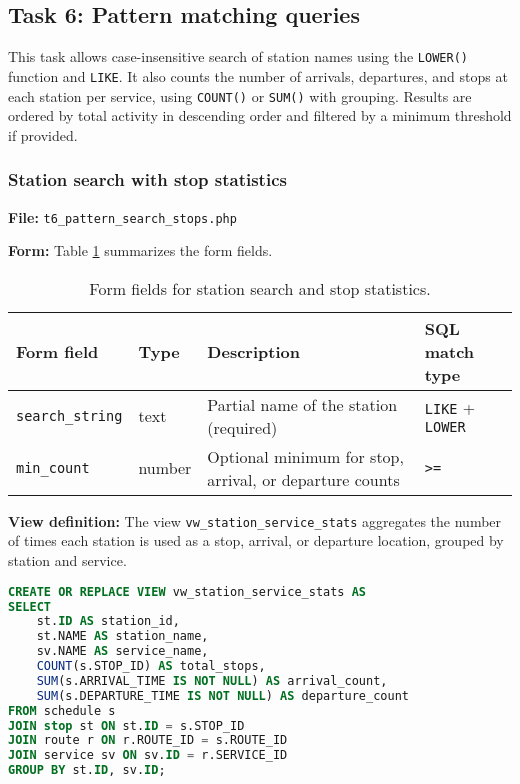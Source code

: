 \documentclass[a4paper, 12pt]{article}
\begin{document}
% 
\subsection{Task 6: Pattern matching queries}

This task allows case-insensitive search of station names using the \texttt{LOWER()} function and \texttt{LIKE}. It also counts the number of arrivals, departures, and stops at each station per service, using \texttt{COUNT()} or \texttt{SUM()} with grouping. Results are ordered by total activity in descending order and filtered by a minimum threshold if provided. 

\subsubsection{Station search with stop statistics}

\textbf{File:} \texttt{t6\_pattern\_search\_stops.php}

\textbf{Form:} Table \ref{tab:p3-t6-search-form} summarizes the form fields.

\begin{table}[H]
    \centering
    \footnotesize
    \caption{Form fields for station search and stop statistics.}
    \label{tab:p3-t6-search-form}
    \begin{tabular}{llll}
        \toprule
        \textbf{Form field} & \textbf{Type} & \textbf{Description} & \textbf{SQL match type} \\
        \midrule
        \texttt{search\_string} & text   & Partial name of the station (required) & \texttt{LIKE} + \texttt{LOWER} \\
        \texttt{min\_count}     & number & Optional minimum for stop, arrival, or departure counts & \texttt{>=} \\
        \bottomrule
    \end{tabular}
\end{table}


\textbf{View definition:} The view \texttt{vw\_station\_service\_stats} aggregates the number of times each station is used as a stop, arrival, or departure location, grouped by station and service.

\begin{lstlisting}[language=SQL]
CREATE OR REPLACE VIEW vw_station_service_stats AS
SELECT 
    st.ID AS station_id,
    st.NAME AS station_name,
    sv.NAME AS service_name,
    COUNT(s.STOP_ID) AS total_stops,
    SUM(s.ARRIVAL_TIME IS NOT NULL) AS arrival_count,
    SUM(s.DEPARTURE_TIME IS NOT NULL) AS departure_count
FROM schedule s
JOIN stop st ON st.ID = s.STOP_ID
JOIN route r ON r.ROUTE_ID = s.ROUTE_ID
JOIN service sv ON sv.ID = r.SERVICE_ID
GROUP BY st.ID, sv.ID;
\end{lstlisting}
\end{document}
